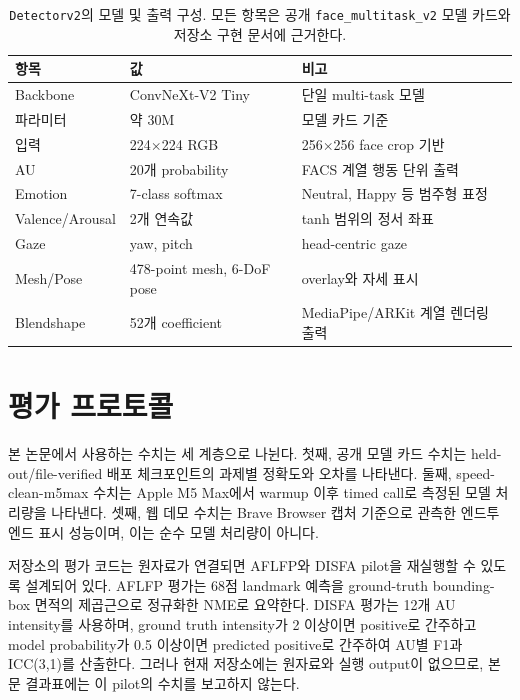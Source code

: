 \documentclass[11pt]{article}
\newcommand{\model}{\texttt{face\_multitask\_v2}}
\newcommand{\detector}{\texttt{Detectorv2}}
\begin{document}
\begin{table}[t]
\centering
\caption{\detector{}의 모델 및 출력 구성. 모든 항목은 공개 \model{} 모델 카드와 저장소 구현 문서에 근거한다.}
\label{tab:model}
\begin{tabularx}{\linewidth}{lXl}
\toprule
항목 & 값 & 비고 \\
\midrule
Backbone & ConvNeXt-V2 Tiny & 단일 multi-task 모델 \\
파라미터 & 약 30M & 모델 카드 기준 \\
입력 & 224$\times$224 RGB & 256$\times$256 face crop 기반 \\
AU & 20개 probability & FACS 계열 행동 단위 출력 \\
Emotion & 7-class softmax & Neutral, Happy 등 범주형 표정 \\
Valence/Arousal & 2개 연속값 & tanh 범위의 정서 좌표 \\
Gaze & yaw, pitch & head-centric gaze \\
Mesh/Pose & 478-point mesh, 6-DoF pose & overlay와 자세 표시 \\
Blendshape & 52개 coefficient & MediaPipe/ARKit 계열 렌더링 출력 \\
\bottomrule
\end{tabularx}
\end{table}

\section{평가 프로토콜}

본 논문에서 사용하는 수치는 세 계층으로 나뉜다. 첫째, 공개 모델 카드 수치는 held-out/file-verified 배포 체크포인트의 과제별 정확도와 오차를 나타낸다. 둘째, speed-clean-m5max 수치는 Apple M5 Max에서 warmup 이후 timed call로 측정된 모델 처리량을 나타낸다\cite{PyFeatSpeedM5Max_2026}. 셋째, 웹 데모 수치는 Brave Browser 캡처 기준으로 관측한 엔드투엔드 표시 성능이며, 이는 순수 모델 처리량이 아니다\cite{FacenetWeeklyDemo_2026}.

저장소의 평가 코드는 원자료가 연결되면 AFLFP와 DISFA pilot을 재실행할 수 있도록 설계되어 있다. AFLFP 평가는 68점 landmark 예측을 ground-truth bounding-box 면적의 제곱근으로 정규화한 NME로 요약한다. DISFA 평가는 12개 AU intensity를 사용하며, ground truth intensity가 2 이상이면 positive로 간주하고 model probability가 0.5 이상이면 predicted positive로 간주하여 AU별 F1과 ICC(3,1)를 산출한다\cite{Mavadati_2013}. 그러나 현재 저장소에는 원자료와 실행 output이 없으므로, 본문 결과표에는 이 pilot의 수치를 보고하지 않는다.
\end{document}
